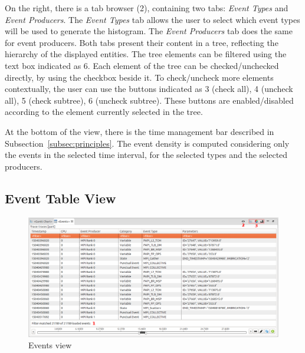 \documentclass[twoside]{article}
\begin{document}
\begin{sloppypar}
On the right, there is a tab browser (\num{2}), containing two tabs: \emph{Event Types} and \emph{Event Producers}. 
The \emph{Event Types} tab allows the user to select which event types will be used to generate the histogram. 
The \emph{Event Producers} tab does the same for event producers. 
Both tabs present their content in a tree, reflecting the hierarchy of the displayed entities. 
The tree elements can be filtered using the text box indicated as \num{6}. 
Each element of the tree can be checked/unchecked directly, by using the checkbox beside it.
To check/uncheck more elements contextually, the user can use the buttons indicated as \num{3} (check all), \num{4} (uncheck all), \num{5} (check subtree), \num{6} (uncheck subtree).
These buttons are enabled/disabled according to the element currently selected in the tree.

At the bottom of the view, there is the time management bar described in Subsection~\ref{subsec:principles}.
The event density is computed considering only the events in the selected time interval, for the selected types and the selected producers.

\subsection{Event Table View}
\label{subsec:table}

\begin{figure}[h!]
  \centering
    \includegraphics[width=1.0\textwidth]{images/table.png}
  \caption{Events view}
  \label{fig:table}
\end{figure}


\end{sloppypar}
\end{document}
